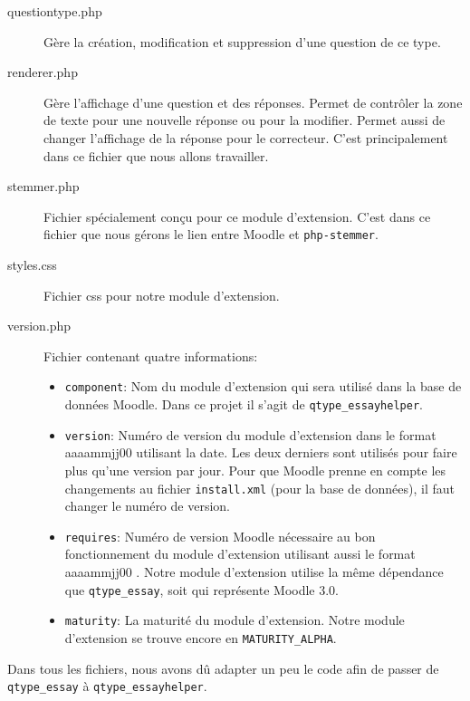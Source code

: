 \begin{description}
 \item[questiontype.php]
 
 G\`ere la cr\'eation, modification et suppression d'une question de ce type.
 
 \item[renderer.php]
 
 G\`ere l'affichage d'une question et des r\'eponses.
 Permet de contr\^oler la zone de texte pour une nouvelle r\'eponse ou pour la modifier.
 Permet aussi de changer l'affichage de la r\'eponse pour le correcteur.
 C'est principalement dans ce fichier que nous allons travailler.
 
 \item[stemmer.php]
 
 Fichier sp\'ecialement con\c{c}u pour ce module d'extension.
 C'est dans ce fichier que nous g\'erons le lien entre Moodle et \texttt{php-stemmer}.
 
 \item[styles.css]
 
 Fichier css pour notre module d'extension.
 
 \item[version.php]
 
 Fichier contenant quatre informations:
 \begin{itemize}
   \item \texttt{component}: 
   Nom du module d'extension qui sera utilis\'e dans la base de donn\'ees Moodle.
   Dans ce projet il s'agit de \texttt{qtype\_essayhelper}.
   
   \item \texttt{version}:
   Num\'ero de version du module d'extension dans le format \og aaaammjj00 \fg{} utilisant la date.
   Les deux derniers  \fg{} sont utilis\'es pour faire plus qu'une version par jour.
   Pour que Moodle prenne en compte les changements au fichier \texttt{install.xml} (pour la base de donn\'ees), il faut changer le num\'ero de version.
   
   \item \texttt{requires}:
   Num\'ero de version Moodle n\'ecessaire au bon fonctionnement du module d'extension utilisant aussi le format \og aaaammjj00 \fg{}.
   Notre module d'extension utilise la m\^eme d\'ependance que \texttt{qtype\_essay}, soit  \fg{} qui repr\'esente Moodle 3.0.
   
   \item \texttt{maturity}:
   La maturit\'e du module d'extension.
   Notre module d'extension se trouve encore en \texttt{MATURITY\_ALPHA}.
 \end{itemize}
\end{description}
Dans tous les fichiers, nous avons d\^u adapter un peu le code afin de passer de \texttt{qtype\_essay} \`a \texttt{qtype\_essayhelper}.

